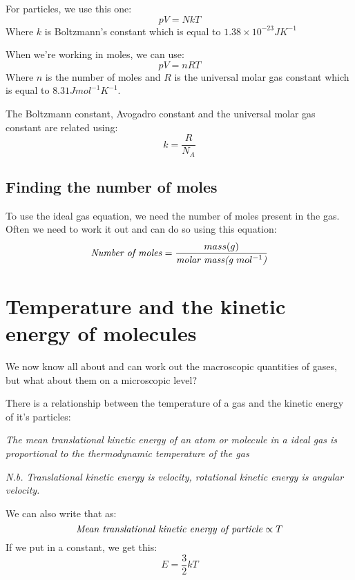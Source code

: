 \documentclass{article}
\begin{document}
For particles, we use this one:
\[
	pV = NkT
\]	
Where $k$ is Boltzmann's constant which is equal to $1.38 \times 10^{-23}JK^{-1}$

When we're working in moles, we can use:
\[
	pV = nRT
\]
Where $n$ is the number of moles and $R$ is the universal molar gas constant which is equal to $8.31Jmol^{-1}K^{-1}$.

The Boltzmann constant, Avogadro constant and the universal molar gas constant are related using:
\[
	k = \frac{R}{N_A}
\]

\subsection*{Finding the number of moles}
To use the ideal gas equation, we need the number of moles present in the gas. Often we need to work it out and can do so using this equation:
\[
	\textrm{\textit{Number of moles}} = \frac{mass(g)}{\textrm{\textit{molar mass(g $mol^{-1}$)}}}
\]

\section*{Temperature and the kinetic energy of molecules}
We now know all about and can work out the macroscopic quantities of gases, but what about them on a microscopic level?

There is a relationship between the temperature of a gas and the kinetic energy of it's particles:

\textit{The mean translational kinetic energy of an atom or molecule in a ideal gas is proportional to the thermodynamic temperature of the gas}

\textit{N.b. Translational kinetic energy is velocity, rotational kinetic energy is angular velocity.}

We can also write that as:
\[
	\textrm{\textit{Mean translational kinetic energy of particle}} \propto T
\]
If we put in a constant, we get this:
\[
	E = \frac{3}{2}kT
\]
\end{document}
